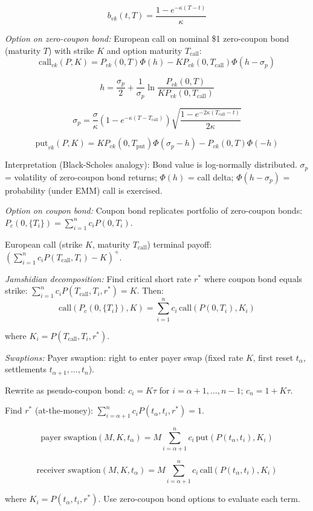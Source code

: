 \documentclass[12pt,a4paper]{article}
\begin{document}
$$b_{vk}(t,T) = \frac{1 - e^{-\kappa(T-t)}}{\kappa}$$

\textit{Option on zero-coupon bond:} European call on nominal \$1 zero-coupon bond (maturity $T$) with strike $K$ and option maturity $T_{\text{call}}$:
$$\text{call}_{vk}(P,K) = P_{vk}(0,T)\Phi(h) - KP_{vk}(0,T_{\text{call}})\Phi(h - \sigma_p)$$

$$h = \frac{\sigma_p}{2} + \frac{1}{\sigma_p}\ln\frac{P_{vk}(0,T)}{KP_{vk}(0,T_{\text{call}})}$$

$$\sigma_p = \frac{\sigma}{\kappa}(1 - e^{-\kappa(T-T_{\text{call}})})\sqrt{\frac{1 - e^{-2\kappa(T_{\text{call}}-t)}}{2\kappa}}$$

$$\text{put}_{vk}(P,K) = KP_{vk}(0,T_{\text{put}})\Phi(\sigma_p - h) - P_{vk}(0,T)\Phi(-h)$$

Interpretation (Black-Scholes analogy): Bond value is log-normally distributed. $\sigma_p$ = volatility of zero-coupon bond returns; $\Phi(h)$ = call delta; $\Phi(h-\sigma_p)$ = probability (under EMM) call is exercised.

\textit{Option on coupon bond:} Coupon bond replicates portfolio of zero-coupon bonds: $P_c(0,\{T_i\}) = \sum_{i=1}^{n} c_i P(0, T_i)$.

European call (strike $K$, maturity $T_{\text{call}}$) terminal payoff: $(\sum_{i=1}^{n} c_i P(T_{\text{call}}, T_i) - K)^+$.

\textit{Jamshidian decomposition:} Find critical short rate $r^*$ where coupon bond equals strike: $\sum_{i=1}^{n} c_i P(T_{\text{call}}, T_i, r^*) = K$. Then:
$$\text{call}(P_c(0,\{T_i\}), K) = \sum_{i=1}^{n} c_i \, \text{call}(P(0, T_i), K_i)$$

where $K_i = P(T_{\text{call}}, T_i, r^*)$.

\textit{Swaptions:} Payer swaption: right to enter payer swap (fixed rate $K$, first reset $t_\alpha$, settlements $t_{\alpha+1}, ..., t_n$).

Rewrite as pseudo-coupon bond: $c_i = K \tau$ for $i = \alpha+1, ..., n-1$; $c_n = 1 + K \tau$.

Find $r^*$ (at-the-money): $\sum_{i=\alpha+1}^{n} c_i P(t_\alpha, t_i, r^*) = 1$.

$$\text{payer swaption}(M, K, t_\alpha) = M \sum_{i=\alpha+1}^{n} c_i \, \text{put}(P(t_\alpha, t_i), K_i)$$

$$\text{receiver swaption}(M, K, t_\alpha) = M \sum_{i=\alpha+1}^{n} c_i \, \text{call}(P(t_\alpha, t_i), K_i)$$

where $K_i = P(t_\alpha, t_i, r^*)$. Use zero-coupon bond options to evaluate each term.
\end{document}

